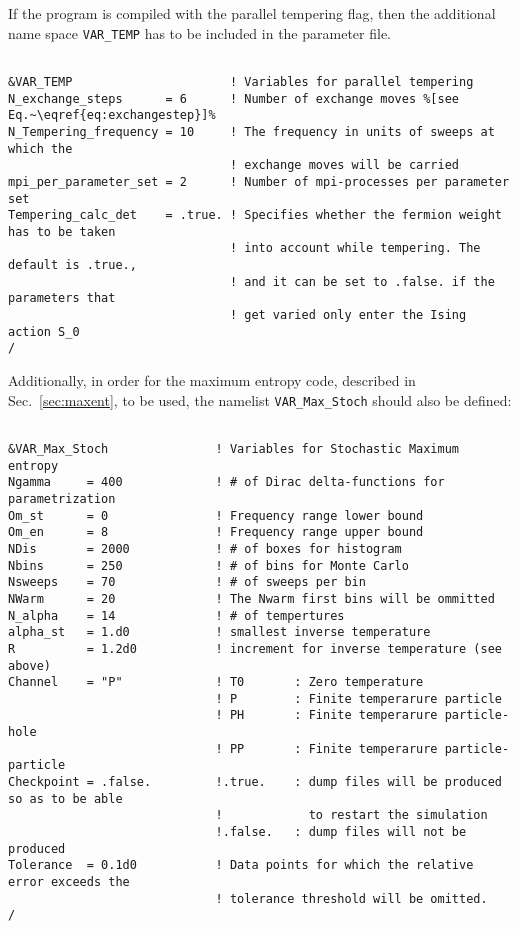If the program is compiled with the parallel tempering flag, then the additional name space \texttt{VAR\_TEMP} has to be included in the parameter file.
\begin{lstlisting}[style=fortran,escapechar=\%]

&VAR_TEMP                      ! Variables for parallel tempering
N_exchange_steps      = 6      ! Number of exchange moves %[see Eq.~\eqref{eq:exchangestep}]%
N_Tempering_frequency = 10     ! The frequency in units of sweeps at which the
                               ! exchange moves will be carried 
mpi_per_parameter_set = 2      ! Number of mpi-processes per parameter set
Tempering_calc_det    = .true. ! Specifies whether the fermion weight has to be taken
                               ! into account while tempering. The default is .true.,
                               ! and it can be set to .false. if the parameters that
                               ! get varied only enter the Ising action S_0
/
\end{lstlisting}

Additionally, in order for the maximum entropy code, described in Sec.~\ref{sec:maxent}, to be used, the namelist \texttt{VAR\_Max\_Stoch} should also be defined:
\begin{lstlisting}[style=fortran]

&VAR_Max_Stoch               ! Variables for Stochastic Maximum entropy
Ngamma     = 400             ! # of Dirac delta-functions for parametrization
Om_st      = 0               ! Frequency range lower bound
Om_en      = 8               ! Frequency range upper bound
NDis       = 2000            ! # of boxes for histogram
Nbins      = 250             ! # of bins for Monte Carlo
Nsweeps    = 70              ! # of sweeps per bin
NWarm      = 20              ! The Nwarm first bins will be ommitted
N_alpha    = 14              ! # of tempertures
alpha_st   = 1.d0            ! smallest inverse temperature
R          = 1.2d0           ! increment for inverse temperature (see above) 
Channel    = "P"             ! T0       : Zero temperature
                             ! P        : Finite temperarure particle 
                             ! PH       : Finite temperarure particle-hole
                             ! PP       : Finite temperarure particle-particle 
Checkpoint = .false.         !.true.    : dump files will be produced so as to be able
                             !            to restart the simulation
                             !.false.   : dump files will not be produced 
Tolerance  = 0.1d0           ! Data points for which the relative error exceeds the
                             ! tolerance threshold will be omitted.
/
\end{lstlisting}


